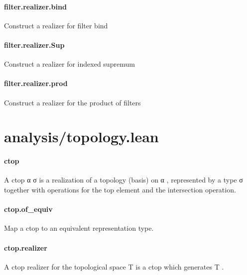 \documentclass{article}
\begin{document}
\paragraph{filter.realizer.bind}
\par
Construct a realizer for filter bind
\paragraph{filter.realizer.Sup}
\par
Construct a realizer for indexed supremum
\paragraph{filter.realizer.prod}
\par
Construct a realizer for the product of filters
\section{analysis/topology.lean}\paragraph{ctop}
\par
A 
\colorbox[RGB]{253,246,227}{{{{\color[RGB]{101, 123, 131} ctop α σ }}}} is a realization of a topology (basis) on 
\colorbox[RGB]{253,246,227}{{{{\color[RGB]{101, 123, 131} α }}}},
represented by a type 
\colorbox[RGB]{253,246,227}{{{{\color[RGB]{101, 123, 131} σ }}}} together with operations for the top element and
the intersection operation.
\paragraph{ctop.of\_equiv}
\par
Map a ctop to an equivalent representation type.
\paragraph{ctop.realizer}
\par
A 
\colorbox[RGB]{253,246,227}{{{{\color[RGB]{101, 123, 131} ctop }}}} realizer for the topological space 
\colorbox[RGB]{253,246,227}{{{{\color[RGB]{101, 123, 131} T }}}} is a 
\colorbox[RGB]{253,246,227}{{{{\color[RGB]{101, 123, 131} ctop }}}}which generates 
\colorbox[RGB]{253,246,227}{{{{\color[RGB]{101, 123, 131} T }}}}.
\end{document}
